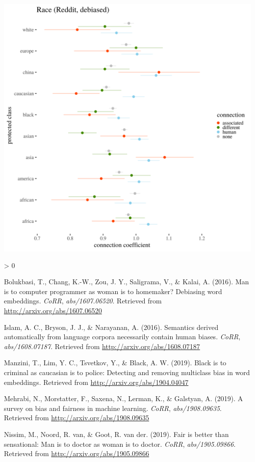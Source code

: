 \documentclass[
  12pt,
]{book}
\newlength{\cslhangindent}
\newenvironment{CSLReferences}[2] %
 {%
  \setlength{\parindent}{0pt}
  \ifodd #1 \everypar{\setlength{\hangindent}{\cslhangindent}}\ignorespaces\fi
  \ifnum #2 > 0
  \setlength{\parskip}{#2\baselineskip}
  \fi
 }%
 {}
\begin{document}
\includegraphics[width=14cm]{../images/visDebRaceReddit.png}

\hypertarget{refs}{}
\begin{CSLReferences}{1}{0}
\leavevmode\hypertarget{ref-Bolukbasi2016Man}{}%
Bolukbasi, T., Chang, K.-W., Zou, J. Y., Saligrama, V., \& Kalai, A. (2016). Man is to computer programmer as woman is to homemaker? Debiasing word embeddings. \emph{CoRR}, \emph{abs/1607.06520}. Retrieved from \url{http://arxiv.org/abs/1607.06520}

\leavevmode\hypertarget{ref-Caliskan2017Semantics}{}%
Islam, A. C., Bryson, J. J., \& Narayanan, A. (2016). Semantics derived automatically from language corpora necessarily contain human biases. \emph{CoRR}, \emph{abs/1608.07187}. Retrieved from \url{http://arxiv.org/abs/1608.07187}

\leavevmode\hypertarget{ref-manzini2019black}{}%
Manzini, T., Lim, Y. C., Tsvetkov, Y., \& Black, A. W. (2019). Black is to criminal as caucasian is to police: Detecting and removing multiclass bias in word embeddings. Retrieved from \url{http://arxiv.org/abs/1904.04047}

\leavevmode\hypertarget{ref-Mehrabi2019Survey}{}%
Mehrabi, N., Morstatter, F., Saxena, N., Lerman, K., \& Galstyan, A. (2019). A survey on bias and fairness in machine learning. \emph{CoRR}, \emph{abs/1908.09635}. Retrieved from \url{http://arxiv.org/abs/1908.09635}

\leavevmode\hypertarget{ref-Nissim2019Fair}{}%
Nissim, M., Noord, R. van, \& Goot, R. van der. (2019). Fair is better than sensational: Man is to doctor as woman is to doctor. \emph{CoRR}, \emph{abs/1905.09866}. Retrieved from \url{http://arxiv.org/abs/1905.09866}

\end{CSLReferences}
\end{document}
